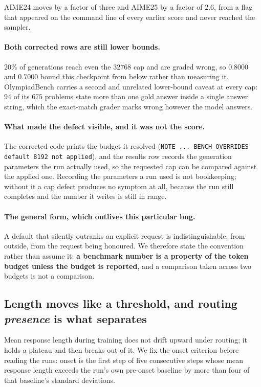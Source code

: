 AIME24 moves by a factor of three and AIME25 by a factor of $2.6$, from a flag that appeared
on the command line of every earlier score and never reached the sampler.

\paragraph{Both corrected rows are still lower bounds.} $20\%$ of generations reach even the
$32768$ cap and are graded wrong, so $0.8000$ and $0.7000$ bound this checkpoint from below
rather than measuring it. OlympiadBench carries a second and unrelated lower-bound caveat at
every cap: $94$ of its $675$ problems state more than one gold answer inside a single answer
string, which the exact-match grader marks wrong however the model answers.

\paragraph{What made the defect visible, and it was not the score.} The corrected code prints
the budget it resolved (\texttt{NOTE ... BENCH\_OVERRIDES default 8192 not applied}), and the
results row records the generation parameters the run actually used, so the requested cap can
be compared against the applied one. Recording the parameters a run used is not bookkeeping;
without it a cap defect produces no symptom at all, because the run still completes and the
number it writes is still in range.

\paragraph{The general form, which outlives this particular bug.} A default that silently
outranks an explicit request is indistinguishable, from outside, from the request being
honoured. We therefore state the convention rather than assume it: \textbf{a benchmark number
is a property of the token budget unless the budget is reported}, and a comparison taken
across two budgets is not a comparison.

\subsection{Length moves like a threshold, and routing \emph{presence} is what separates}
\label{sec:knee}

Mean response length during training does not drift upward under routing; it holds a plateau
and then breaks out of it. We fix the onset criterion before reading the runs: onset is the
first step of five consecutive steps whose mean response length exceeds the run's own
pre-onset baseline by more than four of that baseline's standard deviations.

